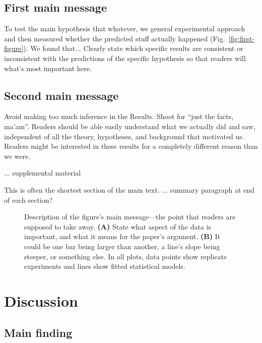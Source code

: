 \documentclass[11pt]{article}
\begin{document}
\subsection{First main message}

To test the main hypothesis that whatever, we general experimental approach and then measured whether the predicted stuff actually happened (Fig.~\ref{fig:first-figure}). 
We found that...
Clearly state which specific results are consistent or inconsistent with the predictions of the specific hypothesis so that readers will what's most important here. 

\subsection{Second main message}

Avoid making too much inference in the Results. Shoot for ``just the facts, ma'am''. Readers should be able easily understand what we actually did and saw, independent of all the theory, hypotheses, and background that motivated us. Readers might be interested in these results for a completely different reason than we were. 

... supplemental material

This is often the shortest section of the main text. 
... summary paragraph at end of each section?


\begin{figure}[p]
\caption{
Description of the figure's main message---the point that readers are supposed to take away. 
\textbf{(A)} State what aspect of the data is important, and what it means for the paper's argument.   
\textbf{(B)} It could be one bar being larger than another, a line's slope being steeper, or something else. 
In all plots, data points show replicate experiments and lines show fitted statistical models. 
}
\label{fig:second-figure}
\end{figure}




\clearpage
\section{Discussion}

\subsection{Main finding}
\end{document}
